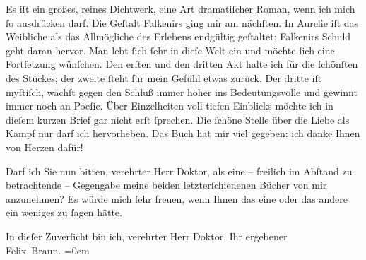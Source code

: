 \pstart
           Es iſt ein großes, reines Dichtwerk, eine Art dramatiſcher Roman, wenn ich mich ſo
               ausdrücken darf. Die Geſtalt Falkenirs ging mir am nächſten. In Aurelie iſt das Weibliche als das Allmögliche des Erlebens
               endgültig geſtaltet; Falkenirs
               Schuld geht daran hervor. Man lebt ſich ſehr in dieſe Welt ein und möchte ſich eine
               Fortſetzung wün{\pb}ſchen. Den erſten und den dritten Akt
               halte ich für die ſchönſten des Stückes; der zweite ſteht für mein Gefühl etwas
               zurück. Der dritte iſt myſtiſch, wächſt gegen den Schluß immer höher ins
               Bedeutungsvolle und gewinnt immer noch an Poeſie. Über Einzelheiten voll tiefen
               Einblicks möchte ich in dieſem kurzen Brief gar nicht erſt ſprechen. Die ſchöne
               Stelle über die Liebe als Kampf nur darf ich hervorheben. Das Buch hat mir viel gegeben: ich danke Ihnen
               von Herzen dafür!\pend
           
\pstart
           Darf ich Sie nun bitten, verehrter Herr Doktor, als eine – freilich im Abſtand zu
               betrachtende – Gegengabe meine beiden letzterſchienenen Bücher von mir anzunehmen? Es
               würde mich ſehr freuen, wenn Ihnen das eine oder das andere ein weniges zu ſagen
               hätte.\pend
           
\pstart
           In dieſer Zuverſicht bin ich, verehrter Herr Doktor, Ihr ergebener{\\[\baselineskip]}\spacefill\mbox{Felix Braun.}\pend
           \leftskip=0em{}\endnumbering{}  
      